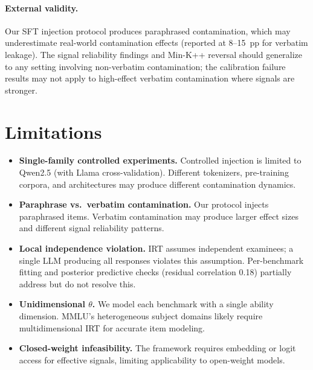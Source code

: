 \documentclass[11pt]{article}
\begin{document}
\paragraph{External validity.}
Our SFT injection protocol produces paraphrased contamination, which may underestimate real-world contamination effects (reported at 8--15~pp for verbatim leakage).
The signal reliability findings and Min-K++ reversal should generalize to any setting involving non-verbatim contamination; the calibration failure results may not apply to high-effect verbatim contamination where signals are stronger.


\section{Limitations}

\begin{itemize}
\item \textbf{Single-family controlled experiments.} Controlled injection is limited to Qwen2.5 (with Llama cross-validation). Different tokenizers, pre-training corpora, and architectures may produce different contamination dynamics.

\item \textbf{Paraphrase vs.\ verbatim contamination.} Our protocol injects paraphrased items. Verbatim contamination may produce larger effect sizes and different signal reliability patterns.

\item \textbf{Local independence violation.} IRT assumes independent examinees; a single LLM producing all responses violates this assumption. Per-benchmark fitting and posterior predictive checks (residual correlation 0.18) partially address but do not resolve this.

\item \textbf{Unidimensional $\theta$.} We model each benchmark with a single ability dimension. MMLU's heterogeneous subject domains likely require multidimensional IRT \citep{reckase2009multidimensional} for accurate item modeling.

\item \textbf{Closed-weight infeasibility.} The framework requires embedding or logit access for effective signals, limiting applicability to open-weight models.
\end{itemize}
\end{document}

